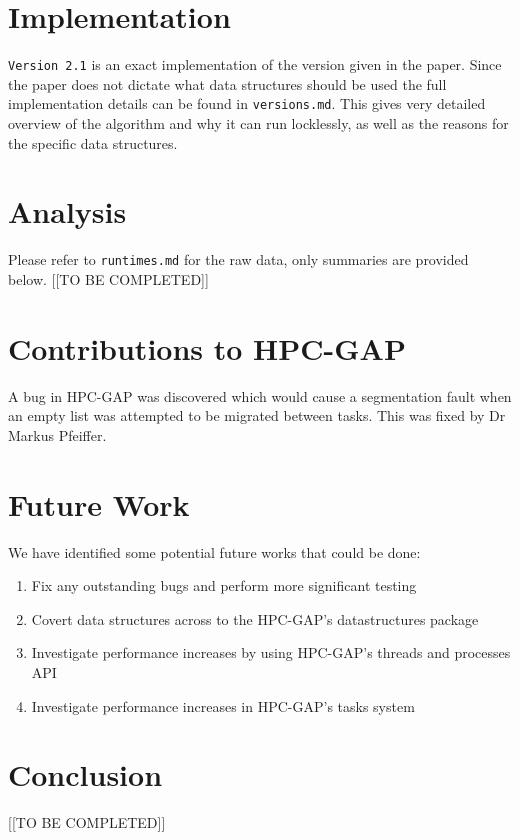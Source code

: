 \documentclass{report}
\begin{document}
\section*{Implementation}
\texttt{Version 2.1} is an exact implementation of the version given in the paper. Since the paper does not dictate what data structures should be used
the full implementation details can be found in \texttt{versions.md}. This gives very detailed overview of the algorithm and why it can run locklessly,
as well as the reasons for the specific data structures.

\section*{Analysis}
Please refer to \texttt{runtimes.md} for the raw data, only summaries are provided below.
[[TO BE COMPLETED]]

\section*{Contributions to HPC-GAP}
A bug in HPC-GAP was discovered which would cause a segmentation fault when an empty list was attempted to be migrated between tasks.
This was fixed by Dr Markus Pfeiffer\cite{hpcsol}.

\section*{Future Work}
We have identified some potential future works that could be done:

\begin{enumerate}
\item Fix any outstanding bugs and perform more significant testing
\item Covert data structures across to the HPC-GAP's datastructures package\cite{ds}
\item Investigate performance increases by using HPC-GAP's threads and processes API
\item Investigate performance increases in HPC-GAP's tasks system
\end{enumerate}

\section*{Conclusion}
[[TO BE COMPLETED]]



\end{document}

